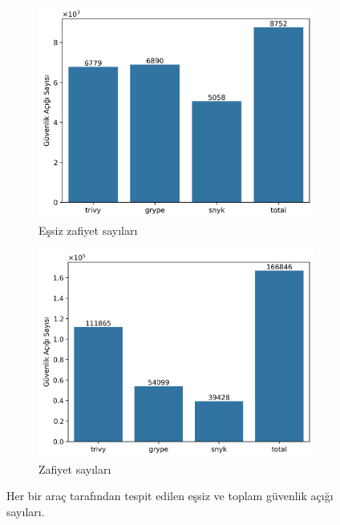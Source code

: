 \begin{figure}
	\centering
	\begin{subfigure}[]{\linewidth/2}
		\includegraphics[width=\linewidth]{images/s1/vulCountsUniq.png}
		\caption{Eşsiz zafiyet sayıları}\label{fig:vulCountsUniq}
	\end{subfigure}%
	\begin{subfigure}[]{\linewidth/2}
		\includegraphics[width=\linewidth]{images/s1/vulCountsAll.png}
		\caption{Zafiyet sayıları}\label{fig:vulCountsAll}
	\end{subfigure}

	\caption{Her bir araç tarafından tespit edilen eşsiz ve toplam güvenlik açığı sayıları.}\label{fig:fig1}
\end{figure}

